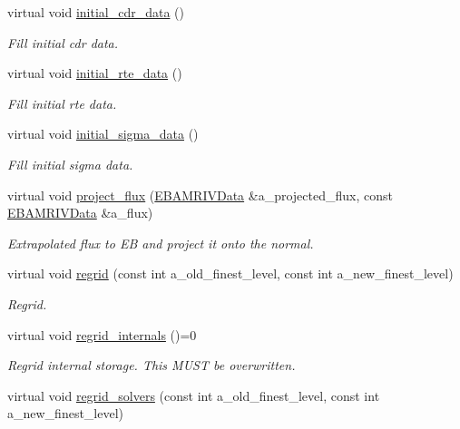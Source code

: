 \begin{DoxyCompactItemize}
virtual void \hyperlink{classtime__stepper_a548cc3bf38cbf47fc0166927ffcc5475}{initial\+\_\+cdr\+\_\+data} ()
\begin{DoxyCompactList}\small\item\em Fill initial cdr data. \end{DoxyCompactList}\item 
virtual void \hyperlink{classtime__stepper_a9d41a3b04d410de2d7f000ad9007497a}{initial\+\_\+rte\+\_\+data} ()
\begin{DoxyCompactList}\small\item\em Fill initial rte data. \end{DoxyCompactList}\item 
virtual void \hyperlink{classtime__stepper_a57b20a0060e1a38983752ba625e6a515}{initial\+\_\+sigma\+\_\+data} ()
\begin{DoxyCompactList}\small\item\em Fill initial sigma data. \end{DoxyCompactList}\item 
virtual void \hyperlink{classtime__stepper_a04a1233962d7be86ec511dfcad3180b6}{project\+\_\+flux} (\hyperlink{type__definitions_8H_a6b8fa905d55cbb491b52180386f0e0c1}{E\+B\+A\+M\+R\+I\+V\+Data} \&a\+\_\+projected\+\_\+flux, const \hyperlink{type__definitions_8H_a6b8fa905d55cbb491b52180386f0e0c1}{E\+B\+A\+M\+R\+I\+V\+Data} \&a\+\_\+flux)
\begin{DoxyCompactList}\small\item\em Extrapolated flux to EB and project it onto the normal. \end{DoxyCompactList}\item 
virtual void \hyperlink{classtime__stepper_a851ca4f6c6303f89aa43ca46e2b0c993}{regrid} (const int a\+\_\+old\+\_\+finest\+\_\+level, const int a\+\_\+new\+\_\+finest\+\_\+level)
\begin{DoxyCompactList}\small\item\em Regrid. \end{DoxyCompactList}\item 
virtual void \hyperlink{classtime__stepper_a52a437edbc252b67ae72522c69ec9bc6}{regrid\+\_\+internals} ()=0
\begin{DoxyCompactList}\small\item\em Regrid internal storage. This M\+U\+ST be overwritten. \end{DoxyCompactList}\item 
virtual void \hyperlink{classtime__stepper_a35eb07117ba6f556d4cacfe8be3fc4a5}{regrid\+\_\+solvers} (const int a\+\_\+old\+\_\+finest\+\_\+level, const int a\+\_\+new\+\_\+finest\+\_\+level)

\end{DoxyCompactItemize}

